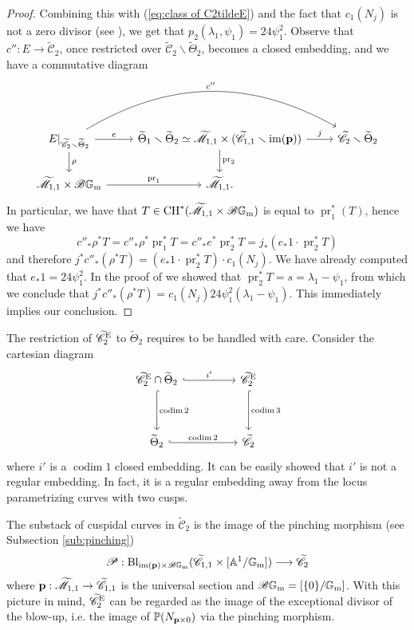 \documentclass[a4paper, 10pt]{amsart}
\numberwithin{equation}{section}
\numberwithin{subsection}{section}
\theoremstyle{definition}
\theoremstyle{remark}
\renewcommand{\mathcal}{\mathscr}
\renewcommand\AA{\mathbb{A}} \newcommand\BB{\mathbb{B}}
\newcommand\GG{\mathbb{G}} \newcommand\HH{\mathbb{H}}
\newcommand\rmm{\mathrm{m}} \newcommand\rmn{\mathrm{n}}
\newcommand\im[1]{\operatorname{im}(#1)}
\newcommand\codim{\operatorname{codim}}
\newcommand\pr{\operatorname{pr}}
\renewcommand{\setminus}{\smallsetminus}
\newcommand{\gm}{\GG_{\rmm}}
\newcommand{\Mtilde}{\widetilde{\mathcal M}}
\newcommand{\Ctilde}{\widetilde{\mathcal C}}
\newcommand{\ThTilde}{\widetilde{\Theta}}
\newcommand{\ch}[1][*]{\operatorname{CH}^{#1}}
\begin{document}
\begin{proof}
		Combining this with (\ref{eq:class of C2tildeE}) and the fact that $c_1(N_j)$ is not a zero divisor (see ), we get that $p_2(\lambda_1,\psi_1) = 24\psi_1^2$.
		Observe that $c'':E\to\Ctilde_2$, once restricted over $\Ctilde_2\smallsetminus\ThTilde_2$, becomes a closed embedding, and we have a commutative diagram 
		\[
		\begin{tikzcd}
		    E|_{\Ctilde_2\smallsetminus\ThTilde_2} \ar[r, "e"] \ar[rr, bend left, "c''"] \ar[d, "\rho"] & \ThTilde_1\smallsetminus\ThTilde_2 \simeq \Mtilde_{1,1}\times(\Ctilde_{1,1}\setminus \im{\bfp})\ar[r, "j"] \ar[d, "\pr_2"] & \Ctilde_2\smallsetminus\ThTilde_2 \\
		    \Mtilde_{1,1}\times \cB\gm \ar[r, "\pr_1"] & \Mtilde_{1,1}. & 
		\end{tikzcd}
		\]
		In particular, we have that $T\in \ch(\Mtilde_{1,1}\times\cB\gm)$ is equal to $\pr_1^*(T)$, hence we have
		\[ c''_*\rho^*T=c''_*\rho^*\pr_1^*T=c''_*e^*\pr_2^*T=j_*(e_*1 \cdot \pr_2^*T) \]
		and therefore $j^*c''_*(\rho^*T) = (e_*1\cdot\pr_2^*T)\cdot c_1(N_j)$. We have already computed that $e_*1=24\psi_1^2$. In the proof of  we showed that $\pr_2^*T=s=\lambda_1-\psi_1$, from which we conclude that $j^*c''_*(\rho^*T)= c_1(N_j)24\psi_1^2(\lambda_1-\psi_1)$. This immediately implies our conclusion.
	\end{proof}
	
	The restriction of $\Ctilde_2^{\rm E}$ to $\ThTilde_2$ requires to be handled with care.
	Consider the cartesian diagram
	$$\begin{tikzcd}
		\Ctilde_2^{\rm E} \cap \ThTilde_2 \arrow[rr, "i'", hook] \arrow[dd, "\codim{2}", hook] &  & \Ctilde_2^{\rm E} \arrow[dd, "\codim{3}", hook] \\
		&  &                                   \\
		\ThTilde_2 \arrow[rr, "\codim{2}", hook]                                &  & \Ctilde_2                        
	\end{tikzcd}$$
	where $i'$ is a $\codim{1}$ closed embedding. It can be easily showed that $i'$ is not a regular embedding. In fact, it is a regular embedding away from the locus parametrizing curves with two cusps.
	
	The substack of cuspidal curves in $\Ctilde_2$ is the image of the pinching morphism (see Subsection \ref{sub:pinching}) $$\cP:{\rm Bl}_{\im{\bfp}\times\cB\gm}(\Ctilde_{1,1}\times [\AA^1/\gm]) \longrightarrow \Ctilde_2$$
	where $\bfp: \Mtilde_{1,1} \rightarrow \Ctilde_{1,1}$ is the universal section and $\cB\gm=[\{0\}/\gm]$. 
	With this picture in mind, $\Ctilde_2^{\rm E}$ can be regarded as the image of the exceptional divisor of the blow-up, i.e. the image of $\mathbb{P}(N_{\mathbf{p} \times 0})$ via the pinching morphism.
	
\end{document}
